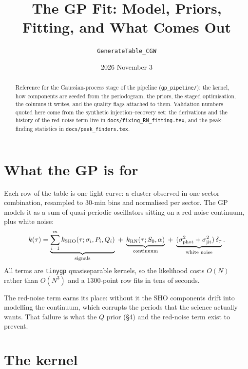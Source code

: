 \documentclass[11pt]{article}
\title{The GP Fit: Model, Priors, Fitting, and What Comes Out}
\author{\texttt{GenerateTable\_CGW}}
\date{2026 November 3}
\newcommand{\code}[1]{\texttt{#1}}
\begin{document}
\maketitle

\begin{abstract}
Reference for the Gaussian-process stage of the pipeline (\code{gp\_pipeline/}): the kernel,
how components are seeded from the periodogram, the priors, the staged optimisation, the
columns it writes, and the quality flags attached to them. Validation numbers quoted here
come from the synthetic injection--recovery set; the derivations and the history of the
red-noise term live in \code{docs/fixing\_RN\_fitting.tex}, and the peak-finding statistics
in \code{docs/peak\_finders.tex}.
\end{abstract}

\section{What the GP is for}

Each row of the table is one light curve: a cluster observed in one sector combination,
resampled to 30-min bins and normalised per sector. The GP models it as a sum of
quasi-periodic oscillators sitting on a red-noise continuum, plus white noise:
\begin{equation}
k(\tau) = \underbrace{\sum_{i=1}^{m} k_{\rm SHO}(\tau;\sigma_i, P_i, Q_i)}_{\text{signals}}
\;+\; \underbrace{k_{\rm RN}(\tau; S_0, \alpha)}_{\text{continuum}}
\;+\; \underbrace{(\sigma_{\rm phot}^2 + \sigma_{\rm jit}^2)\,\delta_\tau}_{\text{white noise}} .
\end{equation}
All terms are \code{tinygp} quasiseparable kernels, so the likelihood costs $O(N)$ rather
than $O(N^3)$ and a 1300-point row fits in tens of seconds.

The red-noise term earns its place: without it the SHO components drift into modelling the
continuum, which corrupts the periods that the science actually wants. That failure is what
the $Q$ prior (\S4) and the red-noise term exist to prevent.

\section{The kernel}
\end{document}
